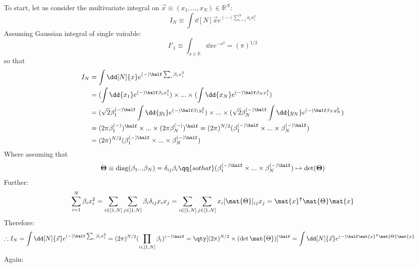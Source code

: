 To start, let us consider 
the multivariate integral 
on $\vec{x} 
\equiv (x_{1}, ..., x_{N}) 
\in \mathbb{R}^{N}$:
$$
    I_{N}
\equiv 
    \int \dd [N] {\vec{x}}
    e^ 
    { (-) \sum _{i = 1} ^{N}
    a_{i} x _{i} ^{2}}
$$
Assuming Gaussian integral of single vairable: 
$$
    I '_{1} 
\equiv 
    \int _{x \in \mathbb{R}}
\dd{x}
    e^{ - x^{2} }
=
    (\pi) ^{1/2}
$$ 
so that 
\begin{align*}
    I _{N}
& =
    \int \dd [N] {x} 
e^
{ (-) \half 
  \sum _{i}
  \beta _{i}  x _{i} ^{2} } 
\\
& =  
( \int \dd{x_{1}}  
  e^ 
  { (-) \half 
    \beta _{1}  x _{1} ^{2} } )
\times ... \times 
( \int \dd{x_{N}}  
  e^ 
  { (-) \half 
    \beta _{N}  x _{1} ^{2} } ) 
\\
& = 
( \sqrt{2} \beta _{1} ^{(-)\half} 
  \int \dd{y_{1}}  
  e^ 
  { (-) \half 
    \beta _{1}  y _{1} ^{2} } )
\times ... \times 
( \sqrt{2} \beta _{N} ^{(-)\half} 
  \int \dd{y_{N}}  
  e^ 
  { (-) \half 
    \beta _{N}  y _{N} ^{2} } )
\\ 
& = 
    (2 \pi \beta _{1} ^{(-)} )
    ^{\half}
\times ... \times 
    (2 \pi \beta _{N} ^{(-)} )
    ^{\half}
= 
    (2 \pi)^{N/2} 
    (\beta_{1} ^{(-) \half} 
    \times ... \times 
    \beta_{N} ^{(-) \half}) 
\\
& = 
    (2 \pi)^{N/2} 
    (\beta_{1} ^{(-) \half} 
    \times ... \times 
    \beta_{N} ^{(-) \half}) 
\end{align*}
Where assuming that 
$$
    \mathbf{\Theta} 
\equiv 
    \text{diag}
    (\beta_{1}...\beta_{N})  
=
    \delta _{ij} \beta_{i}
\qq{so that}
    (\beta_{1} ^{(-) \half} 
    \times ... \times 
    \beta_{N} ^{(-) \half}) 
\mapsto
    \det (\mathbf{\Theta} )
$$
Further:
$$
    \sum _{i=1} ^{N}
    \beta _{i}
    x _{i} ^{2}
=
    \sum _{i \in [1,N]}  
    \sum _{j \in [1,N]} 
    \beta_{i} \delta_{ij}
    x_{i} x_{j} 
=
    \sum _{i \in [1,N]}  
    \sum _{j \in [1,N]} 
    x _{i} 
    [ \mat{\Theta} ] _{ij}
    x _{j}
=
    \mat{x} ^{\intercal} 
    \mat{\Theta} 
    \mat{x}
$$
Therefore:
\begin{align*}
    \therefore 
    I_{N} 
& = 
    \int \dd[N] {\vec{x} } 
e^
{ (-) \half \sum _{i} 
\beta _{i} 
x _{i} ^{2} }
= 
    ( 2\pi )^{N/2} 
    ( \prod _{i \in [1,N]}  
    \beta _{i} )
    ^{(-) \half}
=
    \qty[ 
    ( 2\pi )^{N/2} 
    \times 
    ( \det \mat{\Theta} ) ]
    ^{\half} 
=
    \int \dd[N] {\vec{x} } 
    e^
    { (-) \half 
    \mat{x} ^{\intercal} 
    \mat{\Theta} 
    \mat{x} }
\end{align*}
Again:
